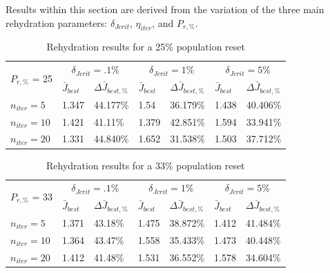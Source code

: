 \noindent Results within this section are derived from the variation of the three main rehydration parameters: $\delta_{Jcrit}$, $\eta_{iter}$,
and $P_{r,\text{\%}}$. 

\begin{table}[H]
  \centering
  \begin{tabular}{lll|ll|ll}
    \toprule
    \multirow{2}{*}{$P_{r,\text{\%}}$ = 25} &
      \multicolumn{2}{c}{$\delta_{Jcrit} = .1\%$  } &
      \multicolumn{2}{c}{$\delta_{Jcrit} =  1\%$} &
      \multicolumn{2}{c}{$\delta_{Jcrit} = 5\%$} \\
      \cmidrule{2-7}
    & $\bar{J}_{best}$ & $\Delta \bar{J}_{best,\text{\%}}$ & $\bar{J}_{best}$ & $\Delta \bar{J}_{best,\text{\%}}$ & $\bar{J}_{best}$ & $\Delta \bar{J}_{best,\text{\%}}$ \\
    \midrule

    $n_{iter}=5$ & 1.347 & 44.177\% & 1.54 & 36.179\% & 1.438 & 40.406\% \\
    $n_{iter}=10$ & 1.421 & 41.11\% & 1.379 & 42.851\% & 1.594 & 33.941\% \\
    $n_{iter}=20$ & 1.331 & 44.840\% & 1.652 & 31.538\% & 1.503 & 37.712\% \\
    \bottomrule
  \end{tabular}
  \caption{Rehydration results for a 25\% population reset}
  \label{tab:rehydation-p25}
\end{table}

\begin{table}[H]
  \centering
  \begin{tabular}{lll|ll|ll}
    \toprule
    \multirow{2}{*}{$P_{r,\text{\%}}$ = 33} &
      \multicolumn{2}{c}{$\delta_{Jcrit} = .1\%$ } &
      \multicolumn{2}{c}{$\delta_{Jcrit} = 1\%$ } &
      \multicolumn{2}{c}{$\delta_{Jcrit} = 5\%$ } \\
      \cmidrule{2-7}
    & $\bar{J}_{best}$ & $\Delta \bar{J}_{best,\text{\%}}$ & $\bar{J}_{best}$ & $\Delta \bar{J}_{best,\text{\%}}$ & $\bar{J}_{best}$ & $\Delta \bar{J}_{best,\text{\%}}$ \\
    \midrule

    $n_{iter}=5$ & 1.371 & 43.18\% & 1.475 & 38.872\% & 1.412 & 41.484\% \\
    $n_{iter}=10$ & 1.364 & 43.47\% & 1.558 & 35.433\% & 1.473 & 40.448\% \\
    $n_{iter}=20$ & 1.412 & 41.48\% & 1.531 & 36.552\% & 1.578 & 34.604\% \\
    \bottomrule
  \end{tabular}
  \caption{Rehydration results for a 33\% population reset}
  \label{tab:rehydation-p33}
\end{table}


